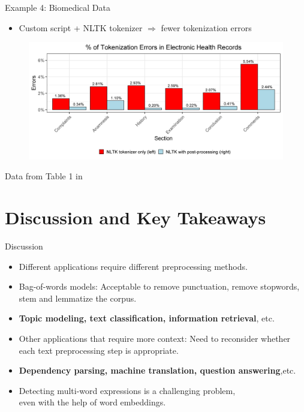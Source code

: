 \documentclass{beamer}
\renewcommand{\cite}{\citep}
\begin{document}
\begin{frame}{Example 4: Biomedical Data}
\begin{itemize}
\item Custom script + NLTK tokenizer $\Rightarrow$ fewer tokenization errors
\end{itemize}
\begin{figure}[!ht]
	\centering
	\includegraphics[width=\textwidth]{Figures/gron2018_table1.png}
\end{figure}
\begin{flushright}
Data from Table 1 in~\cite{gron2018clinical}
\end{flushright}
\end{frame}


\section{Discussion and Key Takeaways}


\begin{frame}{Discussion}
\begin{itemize}
\item Different applications require different preprocessing methods.
	\bigskip
\item Bag-of-words models: Acceptable to remove punctuation, remove stopwords, stem and lemmatize the corpus.
\item \textbf{Topic modeling, text classification, information retrieval}, etc.
	\bigskip
\item Other applications that require more context: Need to reconsider whether each text preprocessing step is appropriate.
\item {\small\textbf{Dependency parsing, machine translation, question answering},etc.}
	\bigskip
\item Detecting multi-word expressions is a challenging problem,\\
	even with the help of word embeddings.~\cite{park2019learning}
\end{itemize}
\end{frame}
\end{document}
